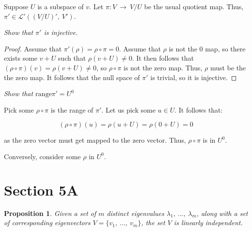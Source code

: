 \documentclass[10pt, oneside]{article}
\newenvironment{problem}[2][Problem]{\begin{trivlist}
\item[\hskip \labelsep {\bfseries #1}\hskip \labelsep {\bfseries #2.}]}{\end{trivlist}}
\newtheorem{prop}{Proposition}
\begin{document}
    \begin{problem}{3.37}
      Suppose $U$ is a subspace of $v$. Let $\pi : V \ \rightarrow \ V/U$ be the usual quotient map. Thus, $\pi' \in \mathcal{L}'((V/U)', \ V')$.
    \end{problem}

    \textit{Show that $\pi'$ is injective.}

    \begin{proof}
      Assume that $\pi'(\rho) = \rho \circ \pi = 0$. Assume that $\rho$ is not the $0$ map, so there exists some $v + U$ such that $\rho(v + U) \neq 0$. It then
      follows that $(\rho \circ \pi)(v) = \rho(v + U) \neq 0$, so $\rho \circ \pi$ is not the zero map. Thus, $\rho$ must be the the zero map. It follows that the
      null space of $\pi'$ is trivial, so it is injective.
    \end{proof}

    \textit{Show that $\text{range} \pi' = U^{0}$}

    Pick some $\rho \circ \pi$ is the range of $\pi'$. Let us pick some $u \in U$. It follows that:

    $$(\rho \circ \pi)(u) = \rho(u + U) = \rho(0 + U) = 0$$

    as the zero vector must get mapped to the zero vector. Thus, $\rho \circ \pi$ is in $U^{0}$.
    \newline

    Conversely, consider some $\rho$ in $U^{0}$. 

    \section{Section 5A}

    \begin{prop}
      Given a set of $m$ distinct eigenvalues $\lambda_1, \ ..., \ \lambda_m$, along with a set of corresponding eigenvectors $V = \{v_1, \ ..., \ v_m\}$, the
      set $V$ is linearly independent.
    \end{prop}
\end{document}
